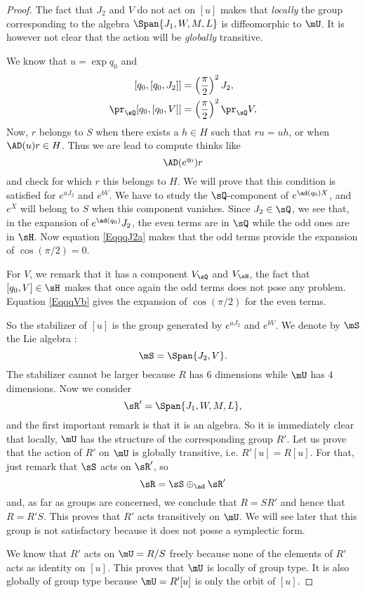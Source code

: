 \begin{proof}
The fact that $J_{2}$ and $V$ do not act on $[u]$ makes that \emph{locally} the group corresponding to the algebra $\Span\{ J_{1},W,M,L \}$ is diffeomorphic to $\mU$. It is however not clear that the action will be \emph{globally} transitive.

We know that $u=\exp q_0$ and
\begin{subequations}
\begin{align}
[q_0,[q_0,J_{2}]]&=\left( \frac{ \pi }{2} \right)^{2}J_{2},         \label{EqqqJ2a} \\
\pr_{\sQ}[q_0,[q_0,V]]&=\left( \frac{ \pi }{2} \right)^{2}\pr_{\sQ}V,       \label{EqqqVb}
\end{align}
\end{subequations}
Now, $r$ belongs to $S$ when there exists a $h\in H$ such that $ru=uh$, or when $\AD(u)r\in H$. Thus we are lead to compute thinks like
\[
  \AD( e^{q_0})r
\]
and check for which $r$ this belongs to $H$. We will prove that this condition is satisfied for $ e^{aJ_{2}}$ and $ e^{bV}$. We have to study the $\sQ$-component of $ e^{\ad(q_0)X}$, and $ e^{X}$ will belong to $S$ when this component vanishes. Since $J_2\in\sQ$, we see that, in the expansion of $ e^{\ad(q_0)}J_2$, the even terms are in $\sQ$ while the odd ones are in $\sH$. Now equation \eqref{EqqqJ2a} makes that the odd terms provide the expansion of $\cos(\pi/2)=0$.

For $V$, we remark that it has a component $V_{\sQ}$ and $V_{\sH}$, the fact that $[q_0,V]\in\sH$ makes that once again the odd terms does not pose any problem. Equation \eqref{EqqqVb} gives the expansion of $\cos(\pi/2)$ for the even terms.

So the stabilizer of $[u]$ is the group generated by $ e^{aJ_2}$ and $ e^{bV}$. We denote by $\mS$ the Lie algebra :
\[ 
  \mS=\Span\{ J_2,V \}.
\]
 The stabilizer cannot be larger because $R$ has $6$ dimensions while $\mU$ has $4$ dimensions. Now we consider 
\[ 
  \sR'=\Span\{ J_1,W,M,L \},
\]
and the first important remark is that it is an algebra. So it is immediately clear that locally, $\mU$ has the structure of the corresponding group $R'$. Let us prove that the action of $R'$ on $\mU$ is globally transitive, i.e. $R'[u]=R[u]$. For that, just remark that $\sS$ acts on $\sR'$, so 
\[ 
  \sR=\sS\oplus_{\ad}\sR'
\]
and, as far as groups are concerned, we conclude that $R=SR'$ and hence that $R=R'S$. This proves that $R'$ acts transitively on $\mU$. We will see later that this group is not satisfactory because it does not posse a symplectic form.

We know that $R'$ acts on $\mU=R/S$ freely because none of the elements of $R'$ acts as identity on $[u]$. This proves that $\mU$ is locally of group type. It is also globally of group type because $\mU=R'[u]$ is only the orbit of $[u]$.

\end{proof}

